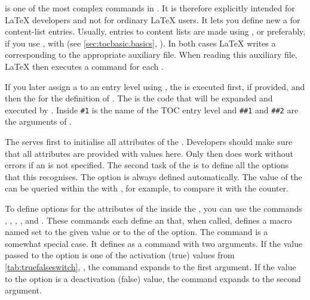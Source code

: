  is
one of the most complex commands in \KOMAScript. It is therefore explicitly
intended for \LaTeX{} developers and not for ordinary \LaTeX{} users. It lets
you define new a  for content-list entries. Usually, entries to
content lists are made using
, or preferably, if you use
, with
 (see
\autoref{sec:tocbasic.basics}, ).
In both cases \LaTeX{} writes a corresponding
 to the appropriate auxiliary file.
When reading this auxiliary file, \LaTeX{} then executes a
 command for each .

If you later assign a  to an entry level using
, the  is
executed first, if provided, and then the  for the
definition of . The  is the
code that will be expanded and executed by .
Inside  \texttt{\#1} is the name of the TOC entry level
and \texttt{\#\#1} and \texttt{\#\#2} are the arguments of
.

The  serves first to initialise all attributes of the
. Developers should make sure that all attributes are provided
with values here. Only then does 
work without errors if an  is not specified. The second
task of the  is to define all the options that this
 recognises. The  option is always defined
automatically. The value of the  can be queried within the
 with %
, for example, to compare it
with the  counter.

To define options for the attributes of the
 inside the , you can use the commands ,
, ,
, and .
These commands each define an  that, when called,
defines a macro named  set to the given value or to the
 of the option. The
 command is a somewhat special case. It defines  as a command with two arguments. If the value passed to
the option is one of the activation (true) values from \autoref{tab:truefalseswitch},
, the command expands to the first
argument. If the value to the option is a deactivation (false) value, the command
expands to the second argument.

